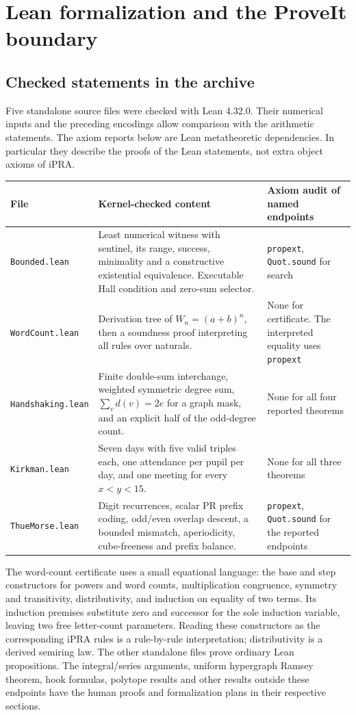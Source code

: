 \section{Lean formalization and the ProveIt boundary}\label{sec:lean}
\subsection{Checked statements in the archive}
Five standalone source files were checked with Lean 4.32.0. Their numerical inputs and the preceding encodings allow comparison with the arithmetic statements. The axiom reports below are Lean metatheoretic dependencies. In particular they describe the proofs of the Lean statements, not extra object axioms of iPRA.

\begin{center}\small\renewcommand{\arraystretch}{1.17}
\begin{tabular}{@{}p{.21\linewidth}p{.495\linewidth}>{\raggedright\arraybackslash}p{.22\linewidth}@{}}\toprule
File & Kernel-checked content & Axiom audit of named endpoints\\\midrule
\texttt{Bounded.lean} & Least numerical witness with sentinel, its range, success, minimality and a constructive existential equivalence. Executable Hall condition and zero-sum selector. & \texttt{propext}, \texttt{Quot.sound} for search\\
\texttt{WordCount.lean} & Derivation tree of $W_n=(a+b)^n$, then a soundness proof interpreting all rules over naturals. & None for certificate. The interpreted equality uses \texttt{propext}\\
\texttt{Handshaking.lean} & Finite double-sum interchange, weighted symmetric degree sum, $\sum_v d(v)=2e$ for a graph mask, and an explicit half of the odd-degree count. & None for all four reported theorems\\
\texttt{Kirkman.lean} & Seven days with five valid triples each, one attendance per pupil per day, and one meeting for every $x<y<15$. & None for all three theorems\\
\texttt{ThueMorse.lean} & Digit recurrences, scalar PR prefix coding, odd/even overlap descent, a bounded mismatch, aperiodicity, cube-freeness and prefix balance. & \texttt{propext}, \texttt{Quot.sound} for the reported endpoints\\\bottomrule
\end{tabular}
\end{center}
The word-count certificate uses a small equational language: the base and step constructors for powers and word counts, multiplication congruence, symmetry and transitivity, distributivity, and induction on equality of two terms. Its induction premises substitute zero and successor for the sole induction variable, leaving two free letter-count parameters. Reading these constructors as the corresponding iPRA rules is a rule-by-rule interpretation; distributivity is a derived semiring law. The other standalone files prove ordinary Lean propositions. The integral/series arguments, uniform hypergraph Ramsey theorem, hook formulas, polytope results and other results outside these endpoints have the human proofs and formalization plans in their respective sections.

